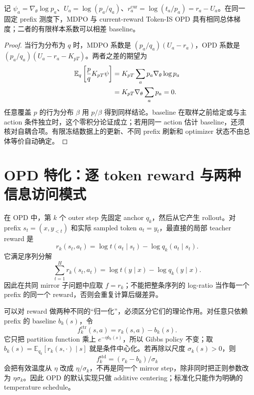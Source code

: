 \begin{proposition}[$\eta=1$ 的 MDPO 与 Token-IS OPD]
\label{opd:eta-one-mdpo}
记 $\psi_a=\nabla_\theta\log p_a$、$U_a=\log(p_a/q_a)$、$r_a^{\mathrm{cur}}=\log(t_a/p_a)=r_a-U_a$。在同一固定 prefix 测度下，MDPO 与 current-reward Token-IS OPD 具有相同总体梯度；二者的有限样本系数可以相差 baseline。
\end{proposition}
\begin{proof}
当行为分布为 $q$ 时，MDPO 系数是 $(p_a/q_a)(U_a-r_a)$，OPD 系数是 $(p_a/q_a)(U_a-r_a-K_{pT})$。两者之差的期望为
\begin{align}
\mathbb E_q\left[\frac pqK_{pT}\psi\right]
&=K_{pT}\sum_a p_a\nabla_\theta\log p_a\\
&=K_{pT}\nabla_\theta\sum_a p_a=0.
\end{align}
任意覆盖 $p$ 的行为分布 $\beta$ 用 $p/\beta$ 得到同样结论。baseline 在取样之前给定或与主 action 条件独立时，这个零积分论证成立；若用同一 action 估计 baseline，还须核对自耦合项。有限冻结数据上的更新、不同 prefix 刷新和 optimizer 状态不由总体等价自动确定。
\end{proof}

\section{OPD 特化：逐 token reward 与两种信息访问模式}
\label{sec:ch2-opd-specialization}

在 OPD 中，第 $k$ 个 outer step 先固定 anchor $q_k$，然后从它产生 rollout。对 prefix $s_t=(x,y_{<t})$ 和实际 sampled token $a_t=y_t$，最直接的局部 teacher reward 是
\begin{equation}
\label{eq:ch2-opd-raw-reward}
r_k(s_t,a_t)=\log t(a_t\mid s_t)-\log q_k(a_t\mid s_t).
\end{equation}
它满足序列分解
\begin{equation}
\sum_{t=1}^H r_k(s_t,a_t)=\log t(y\mid x)-\log q_k(y\mid x).
\end{equation}
因此在共同 mirror 子问题中应取 $f=r_k$；不能把整条序列的 log-ratio 当作每一个 prefix 的同一个 reward，否则会重复计算后缀差异。

可以对 reward 做两种不同的“归一化”，必须区分它们的理论作用。对任意只依赖 prefix 的 baseline $b_k(s)$，令
\begin{equation}
\label{eq:ch2-opd-centered-reward}
f_k^{\mathrm{ctr}}(s,a)=r_k(s,a)-b_k(s).
\end{equation}
它只把 partition function 乘上 $e^{-\eta b_k(s)}$，所以 Gibbs policy 不变；取 $b_k(s)=\mathbb E_{q_k}[r_k(s,\cdot)\mid s]$ 就是条件中心化。若再除以尺度 $\sigma_k(s)>0$，则
\begin{equation}
f_k^{\mathrm{std}}=(r_k-b_k)/\sigma_k
\end{equation}
会把有效温度从 $\eta$ 改成 $\eta/\sigma_k$，不再是同一个 mirror step，除非同时把正则参数改为 $\eta\sigma_k$。因此 OPD 的默认实现只做 additive centering；标准化只能作为明确的 temperature schedule。

